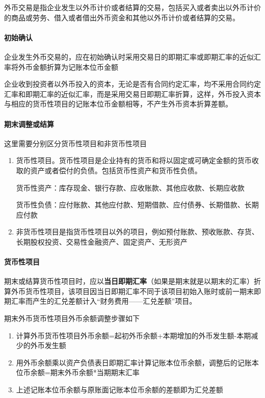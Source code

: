 \documentclass[UTF8,12pt]{ctexart}
\numberwithin{equation}{section} %
\numberwithin{figure}{section}
\numberwithin{table}{section}
\begin{document}
	外币交易是指企业发生以外币计价或者结算的交易，包括买入或者卖出以外币计价的商品或劳务、借入或者借出外币资金和其他以外币计价或者结算的交易。
	
	\paragraph{初始确认}
	企业发生外币交易的，应在初始确认时采用交易日的即期汇率或即期汇率的近似汇率将外币金额折算为记账本位币金额
	
	企业收到投资者以外币投入的资本，无论是否有合同约定汇率，均不采用合同约定汇率和即期汇率的近似汇率，而是采用交易日即期汇率折算，这样，外币投入资本与相应的货币性项目的记账本位币金额相等，不产生外币资本折算差额。
	
	\paragraph{期末调整或结算}
	这里需要分别区分货币性项目和非货币性项目
	\begin{enumerate}
		\item 货币性项目。货币性项目是企业持有的货币和将以固定或可确定金额的货币收取的资产或者偿付的负债。包括货币性资产和货币性负债。
		
		货币性资产：库存现金、银行存款、应收账款、其他应收款、长期应收款
		
		货币性负债：应付账款、其他应付款、短期借款、应付债券、长期借款、长期应付款
		
		\item 非货币性项目是指货币性项目以外的项目，例如预付账款、预收账款、存货、长期股权投资、交易性金融资产、固定资产、无形资产
		
	\end{enumerate}
	
	\paragraph{货币性项目}
	期末或结算货币性项目时，应以\textbf{当日即期汇率}（如果是期末就是以期末的汇率）折算外币货币性项目，该项目因当日即期汇率不同于该项目初始入账时或前一期末即期汇率而产生的汇兑差额计入“财务费用——汇兑差额”项目。
	
	期末外币货币性项目外币余额调整步骤如下
	\begin{enumerate}
		\item 计算外币货币性项目外币余额=起初外币余额+本期增加的外币发生额-本期减少的外币发生额
		
		\item 用外币余额乘以资产负债表日即期汇率计算记账本位币余额，调整后的记账本位币余额=期末外币余额*当期期末汇率
		
		\item 上述记账本位币余额与原账面记账本位币余额的差额即为汇兑差额
	\end{enumerate}
	
\end{document}
